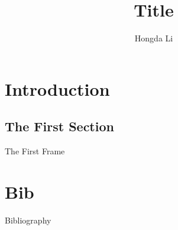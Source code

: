 \documentclass{beamer}
\title[Little Title]{Title}
\author[Hongda Li]{Hongda Li}
\institute[]
{
    {
        \small My Current Institute
    }\\
        \vspace{1cm}
    {
        \small {\color{blue}Sub Title}
    }\\
        \vspace{1cm}
        \date[May ??th 2022]        
}
\date[May ??th 2022]
\begin{document}
\maketitle

\section{Introduction}
    \subsection{The First Section}
        \begin{frame}{The First Frame}
        \end{frame}

\section{Bib}
    \begin{frame}{Bibliography}
        \printbibliography[heading=none]
    \end{frame}
\end{document}
